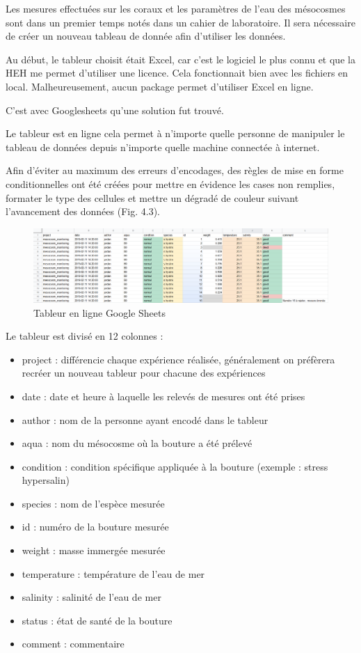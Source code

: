 \documentclass[]{report}
\providecommand{\tightlist}{%
  \setlength{\itemsep}{0pt}\setlength{\parskip}{0pt}}
\begin{document}
Les mesures effectuées sur les coraux et les paramètres de l'eau des
mésocosmes sont dans un premier temps notés dans un cahier de
laboratoire. Il sera nécessaire de créer un nouveau tableau de donnée
afin d'utiliser les données.

Au début, le tableur choisit était Excel, car c'est le logiciel le plus
connu et que la HEH me permet d'utiliser une licence. Cela fonctionnait
bien avec les fichiers en local. Malheureusement, aucun package permet
d'utiliser Excel en ligne.

C'est avec Googlesheets qu'une solution fut trouvé.

Le tableur est en ligne cela permet à n'importe quelle personne de
manipuler le tableau de données depuis n'importe quelle machine
connectée à internet.

Afin d'éviter au maximum des erreurs d'encodages, des règles de mise en
forme conditionnelles ont été créées pour mettre en évidence les cases
non remplies, formater le type des cellules et mettre un dégradé de
couleur suivant l'avancement des données (Fig. 4.3).

\begin{figure}[h!]
\includegraphics[]{../image/tableur-gs.PNG}
\caption{Tableur en ligne Google Sheets}
\end{figure}

Le tableur est divisé en 12 colonnes :

\begin{itemize}
\tightlist
\item
  project : différencie chaque expérience réalisée, généralement on
  préfèrera recréer un nouveau tableur pour chacune des expériences
\item
  date : date et heure à laquelle les relevés de mesures ont été prises
\item
  author : nom de la personne ayant encodé dans le tableur
\item
  aqua : nom du mésocosme où la bouture a été prélevé
\item
  condition : condition spécifique appliquée à la bouture (exemple :
  stress hypersalin)
\item
  species : nom de l'espèce mesurée
\item
  id : numéro de la bouture mesurée
\item
  weight : masse immergée mesurée
\item
  temperature : température de l'eau de mer
\item
  salinity : salinité de l'eau de mer
\item
  status : état de santé de la bouture
\item
  comment : commentaire
\end{itemize}
\end{document}
